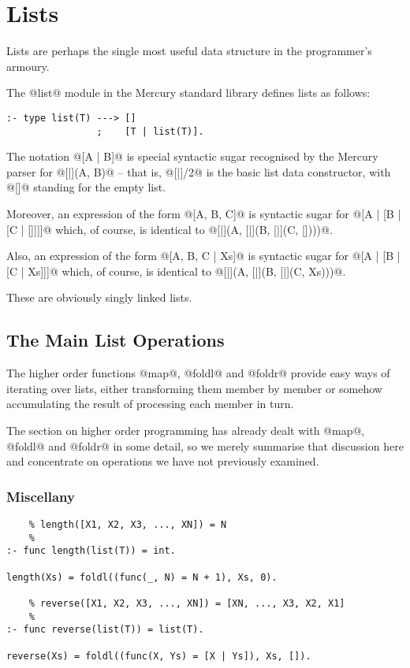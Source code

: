 
\chapter{Lists}

Lists are perhaps the single most useful data structure in the
programmer's armoury.

The @list@ module in the Mercury standard library defines lists as
follows:
\begin{verbatim}
:- type list(T) ---> []
                ;    [T | list(T)].
\end{verbatim}
The notation @[A | B]@ is special syntactic sugar recognised by the
Mercury parser for @[|](A, B)@ -- that is, @[|]/2@ is the basic list
data constructor, with @[]@ standing for the empty list.

Moreover, an expression of the form @[A, B, C]@ is syntactic sugar for
@[A | [B | [C | []]]]@ which, of course, is identical to
@[|](A, [|](B, [|](C, [])))@.

Also, an expression of the form @[A, B, C | Xs]@ is syntactic sugar for
@[A | [B | [C | Xs]]]@ which, of course, is identical to
@[|](A, [|](B, [|](C, Xs)))@.

These are obviously singly linked lists.  

\section{The Main List Operations}

The higher order functions @map@, @foldl@ and @foldr@ provide easy ways
of iterating over lists, either transforming them member by member or
somehow accumulating the result of processing each member in turn.

The section on higher order programming \XXX{} has already dealt with
@map@, @foldl@ and @foldr@ in some detail, so we merely summarise that
discussion here and concentrate on operations we have not previously
examined.

\subsection{Miscellany}

\begin{verbatim}
    % length([X1, X2, X3, ..., XN]) = N
    %
:- func length(list(T)) = int.

length(Xs) = foldl((func(_, N) = N + 1), Xs, 0).

    % reverse([X1, X2, X3, ..., XN]) = [XN, ..., X3, X2, X1]
    %
:- func reverse(list(T)) = list(T).

reverse(Xs) = foldl((func(X, Ys) = [X | Ys]), Xs, []).
\end{verbatim}

